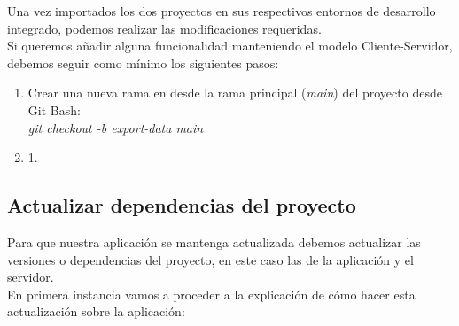 Una vez importados los dos proyectos en sus respectivos entornos de desarrollo integrado, podemos realizar las modificaciones requeridas.\\
Si queremos añadir alguna funcionalidad manteniendo el modelo Cliente-Servidor, debemos seguir como mínimo los siguientes pasos:

\begin{enumerate}
\item
	Crear una nueva rama en desde la rama principal (\textit{main}) del proyecto desde Git Bash:\\
	\textit{git checkout -b export-data main}
\item
	1.
\end{enumerate}

\subsection{Actualizar dependencias del proyecto}

Para que nuestra aplicación se mantenga actualizada debemos actualizar las versiones o dependencias del proyecto, en este caso las de la aplicación y el servidor.\\

En primera instancia vamos a proceder a la explicación de cómo hacer esta actualización sobre la aplicación:

